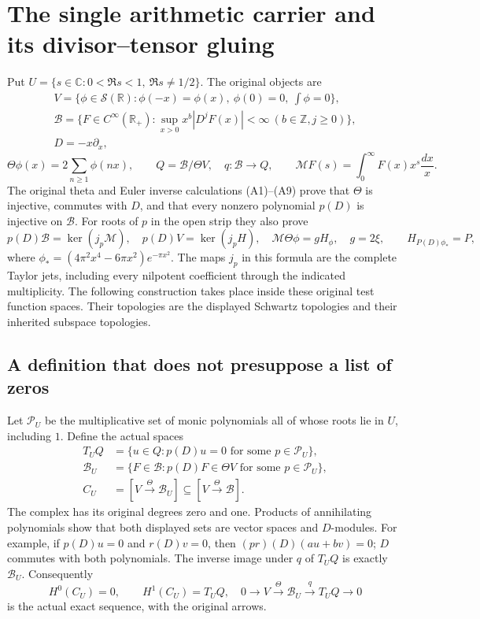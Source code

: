 \section{The single arithmetic carrier and its divisor--tensor gluing}
\label{sec:actual-arithmetic-gluing}

Put $U=\{s\in\mathbb C:0<\Re s<1,\ \Re s\ne1/2\}$.
The original objects are
\[
 \begin{gathered}
 V=\{\phi\in\mathcal S(\mathbb R):\phi(-x)=\phi(x),\
 \phi(0)=0,\ \int\phi=0\},\\
 \mathscr B=\{F\in C^\infty(\mathbb R_+):
 \sup_{x>0}x^b|D^jF(x)|<\infty\ (b\in\mathbb Z,j\ge0)\},\\
 D=-x\partial_x,
 \end{gathered}
\]
\[
 \Theta\phi(x)=2\sum_{n\ge1}\phi(nx),\qquad
 Q=\mathscr B/\Theta V,\quad q:\mathscr B\to Q,\qquad
 \mathcal MF(s)=\int_0^\infty F(x)x^s\frac{dx}{x}.
\]
The original theta and Euler inverse calculations (A1)--(A9) prove
that $\Theta$ is injective, commutes with $D$, and that every
nonzero polynomial $p(D)$ is injective on $\mathscr B$.  For roots of $p$
in the open strip they also prove
\[
 p(D)\mathscr B=\ker(j_p\mathcal M),\quad
 p(D)V=\ker(j_pH),\quad
 \mathcal M\Theta\phi=gH_\phi,\quad g=2\xi,
 \qquad H_{P(D)\phi_*}=P,
 \tag{AG1}
\]
where $\phi_*=(4\pi^2x^4-6\pi x^2)e^{-\pi x^2}$.
The maps $j_p$ in this formula are the complete Taylor jets, including
every nilpotent coefficient through the indicated multiplicity.
The following construction takes place inside these original test
function spaces.  Their topologies are the displayed Schwartz
topologies and their inherited subspace topologies.

\subsection{A definition that does not presuppose a list of zeros}

Let $\mathcal P_U$ be the multiplicative set of monic polynomials all
of whose roots lie in $U$, including $1$.  Define the actual spaces
\[
 \begin{split}
 T_UQ&=\{u\in Q:p(D)u=0\text{ for some }p\in\mathcal P_U\},\\
 \mathscr B_U&=\{F\in\mathscr B:p(D)F\in\Theta V
                         \text{ for some }p\in\mathcal P_U\},\\
 C_U&=[V\xrightarrow{\Theta}\mathscr B_U]
              \subseteq[V\xrightarrow{\Theta}\mathscr B].
 \end{split}\tag{AG2}
\]
The complex has its original degrees zero and one.  Products of
annihilating polynomials show that both displayed sets are vector
spaces and $D$-modules.  For example, if $p(D)u=0$ and $r(D)v=0$,
then $(pr)(D)(au+bv)=0$; $D$ commutes with both polynomials.
The inverse image under $q$ of $T_UQ$ is exactly $\mathscr B_U$.
Consequently
\[
 H^0(C_U)=0,\qquad H^1(C_U)=T_UQ,
 \quad 0\to V\xrightarrow{\Theta}\mathscr B_U
                         \xrightarrow{q}T_UQ\to0
 \tag{AG3}
\]
is the actual exact sequence, with the original arrows.

